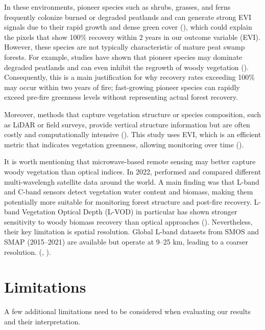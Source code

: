 \documentclass[
  fontsize=12pt,
  paper=a4,
  parskip=half,
  headings=big,
  DIV=12
]{scrreprt}
\begin{document}
In these environments, pioneer species such as shrubs, grasses, and ferns frequently colonize burned or degraded peatlands and can generate strong EVI signals due to their rapid growth and dense green cover (\cite{bousquet_monitoring_2022}), which could explain the pixels that show 100\% recovery within 2 years in our outcome variable (EVI).
However, these species are not typically characteristic of mature peat swamp forests. For example, studies have shown that pioneer species may dominate degraded peatlands and can even inhibit the regrowth of woody vegetation (\cite{blackham_natural_2014}). Consequently, this is a main justification for why recovery rates exceeding 100\% may occur within two years of fire; fast-growing pioneer species can rapidly exceed pre-fire greenness levels without representing actual forest recovery.

Moreover, methods that capture vegetation structure or species composition, such as LiDAR or field surveys, provide vertical structure information but are often costly and computationally intensive (\cite{perez-cabello_remote_2021}).
This study uses EVI, which is an efficient metric that indicates vegetation greenness, allowing monitoring over time (\cite{perez-cabello_remote_2021}).

It is worth mentioning that microwave-based remote sensing may better capture woody vegetation than optical indices. In 2022, \textcite{bousquet_monitoring_2022} performed and compared different multi-wavelengh satellite data around the world. A main finding was that L-band and C-band sensors detect vegetation water content and biomass, making them potentially more suitable for monitoring forest structure and post-fire recovery. L-band Vegetation Optical Depth (L-VOD) in particular has shown stronger sensitivity to woody biomass recovery than optical approaches (\cite{bousquet_monitoring_2022}).
Nevertheless, their key limitation is spatial resolution. Global L-band datasets from SMOS and SMAP (2015–2021) are available but operate at 9–25 km, leading to a coarser resolution. (\cite{entekhabi_soil_2010}, \cite{kerr_smos_2010}).


\section{Limitations}

A few additional limitations need to be considered when evaluating our results and their interpretation.

\end{document}
